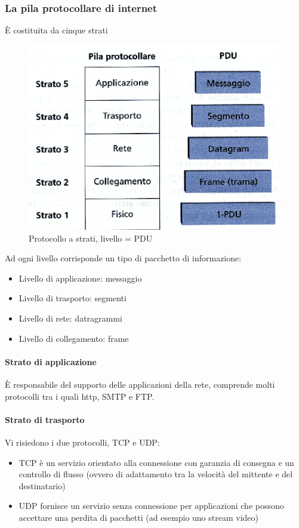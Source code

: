\documentclass[11pt,a4paper]{article}
\begin{document}
\subsubsection{La pila protocollare di internet}
È costituita da cinque strati

\begin{figure}
	\begin{center}
		\includegraphics[scale=1]{img/008.png}
		\caption{Protocollo a strati, livello = PDU}
	\end{center} 
\end{figure}
Ad ogni livello corrisponde un tipo di pacchetto di informazione:
\begin{itemize}
	\item Livello di applicazione: messaggio
	\item Livello di trasporto: segmenti
	\item Livello di rete: datragrammi
	\item Livello di collegamento: frame
\end{itemize}
\paragraph{Strato di applicazione}
È responsabile del supporto delle applicazioni della rete, comprende molti protocolli tra i quali http, SMTP e FTP.
\paragraph{Strato di trasporto}
Vi risiedono i due protocolli, TCP e UDP:
\begin{itemize}
	\item TCP è un servizio orientato alla connessione con garanzia di consegna e un controllo di flusso (ovvero di adattamento tra la velocità del mittente e del destinatario)
	\item UDP fornisce un servizio senza connessione per applicazioni che possono accettare una perdita di pacchetti (ad esempio uno stream video)
\end{itemize}
\end{document}
